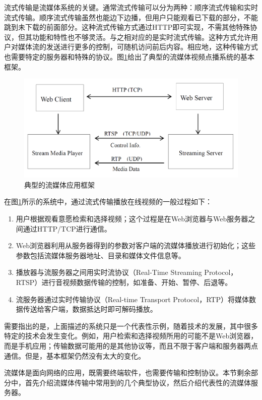 流式传输是流媒体系统的关键。通常流式传输可以分为两种：顺序流式传输和实时流式传输。顺序流式传输虽然也能边下边播，但用户只能观看已下载的部分，不能跳到未下载的前面部分。这种流式传输方式通过HTTP即可实现，不需其他特殊协议，但其功能和特性也不够灵活。与之相对应的是实时流式传输。这种方式允许用户对媒体流的发送进行更多的控制，可随机访问前后内容。相应地，这种传输方式也需要特定的服务器和特殊的协议。图\ref{fig:10}给出了典型的流媒体视频点播系统的基本框架。

\begin{figure}[h]
	\centering
	\includegraphics[width = 1.0\linewidth]{clip/10.png}
	\caption{典型的流媒体应用框架\label{fig:10}}
\end{figure}

在图\ref{fig:10}所示的系统中，通过流式传输播放在线视频的一般过程如下：
\begin{enumerate}
\item 用户根据观看意愿检索和选择视频；这个过程是在Web浏览器与Web服务器之间通过HTTP/TCP进行通信。
\item Web浏览器利用从服务器得到的参数对客户端的流媒体播放进行初始化；这些参数包括流媒体服务器地址、目录和媒体文件信息等。
\item 播放器与流服务器之间用实时流协议（Real-Time Streaming Protocol，RTSP）\supercite{RTSP}进行音视频数据传输的控制，如准备、开始、暂停、后退等。
\item 流服务器通过实时传输协议（Real-time Transport Protocol，RTP）\supercite{RTP}将媒体数据传送给客户端，数据抵达时即可解码播放。
\end{enumerate}

需要指出的是，上面描述的系统只是一个代表性示例，随着技术的发展，其中很多特定的技术会发生变化。例如，用户检索和选择视频所用的可能不是Web浏览器，而是手机应用；传输数据可能用的是其他协议等，而且不限于客户端和服务器两点通信。但是，基本框架仍然没有太大的变化。

流媒体是面向网络的应用，既需要终端软件，也需要传输和控制协议。本节剩余部分中，首先介绍流媒体传输中常用到的几个典型协议，然后介绍代表性的流媒体服务器。

